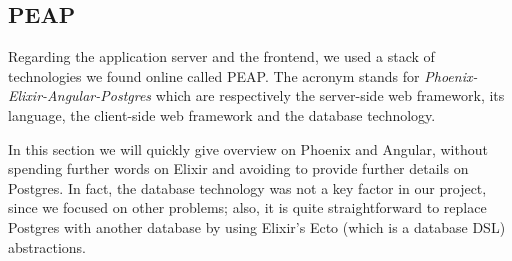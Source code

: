 \subsection{PEAP}
Regarding the application server and the frontend, we used a stack of
technologies we found online called PEAP. The acronym stands for
\textit{Phoenix-Elixir-Angular-Postgres} which are respectively the
server-side web framework, its language, the client-side web framework and the
database technology.

In this section we will quickly give overview on Phoenix and Angular, without
spending further words on Elixir and avoiding to provide further details on
Postgres. In fact, the database technology was not a key factor in our project,
since we focused on other problems; also, it is quite straightforward to
replace Postgres with another database by using Elixir's Ecto (which is a
database DSL) abstractions.
